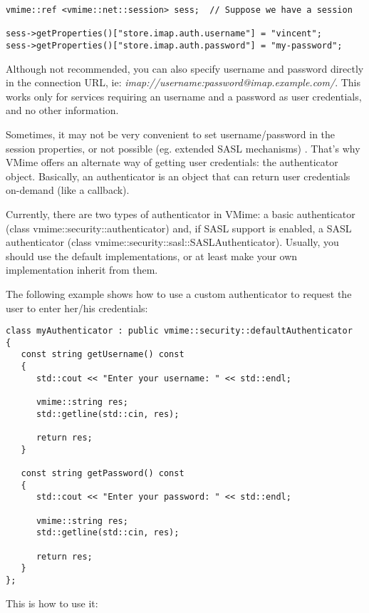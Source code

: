 \begin{lstlisting}[caption={Setting user credentials using session
properties}]
vmime::ref <vmime::net::session> sess;  // Suppose we have a session

sess->getProperties()["store.imap.auth.username"] = "vincent";
sess->getProperties()["store.imap.auth.password"] = "my-password";
\end{lstlisting}

Although not recommended, you can also specify username and password
directly in the connection URL,
ie: \emph{imap://username:password@imap.example.com/}. This works only for
services requiring an username and a password as user credentials, and no
other information.

Sometimes, it may not be very convenient to set username/password in the
session properties, or not possible (eg. extended SASL mechanisms) . That's
why VMime offers an alternate way of getting user credentials: the
{\vcode authenticator} object. Basically, an authenticator is an object that
can return user credentials on-demand (like a callback).

Currently, there are two types of authenticator in VMime: a basic
authenticator (class {\vcode vmime::security::authenticator}) and, if SASL
support is enabled, a SASL authenticator
(class {\vcode vmime::security::sasl::SASLAuthenticator}). Usually, you
should use the default implementations, or at least make your own
implementation inherit from them.

The following example shows how to use a custom authenticator to request
the user to enter her/his credentials:

\begin{lstlisting}[caption={A simple interactive authenticator}]
class myAuthenticator : public vmime::security::defaultAuthenticator
{
   const string getUsername() const
   {
      std::cout << "Enter your username: " << std::endl;

      vmime::string res;
      std::getline(std::cin, res);

      return res;
   }

   const string getPassword() const
   {
      std::cout << "Enter your password: " << std::endl;

      vmime::string res;
      std::getline(std::cin, res);

      return res;
   }
};
\end{lstlisting}

This is how to use it:

